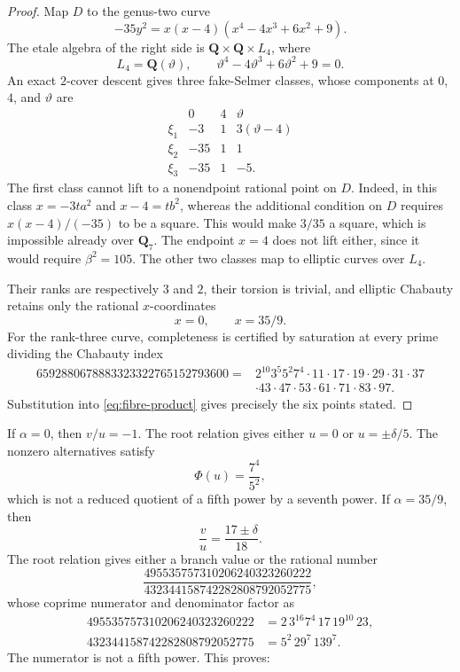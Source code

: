 \documentclass[11pt]{article}
\newcommand{\Q}{\mathbf Q}
\theoremstyle{definition}
\theoremstyle{remark}
\begin{document}
\begin{proof}
Map $D$ to the genus-two curve
\begin{equation}\label{eq:quadratic-genus2}
 -35y^2=x(x-4)(x^4-4x^3+6x^2+9).
\end{equation}
The etale algebra of the right side is
$\Q\times\Q\times L_4$, where
\[
 L_4=\Q(\vartheta),\qquad
 \vartheta^4-4\vartheta^3+6\vartheta^2+9=0.
\]
An exact $2$-cover descent \cite{BruinStollDescent} gives three
fake-Selmer classes, whose components
at $0$, $4$, and $\vartheta$ are
\[
\begin{array}{c|ccc}
 &0&4&\vartheta\\ \hline
 \xi_1&-3&1&3(\vartheta-4)\\
 \xi_2&-35&1&1\\
 \xi_3&-35&1&-5.
\end{array}
\]
The first class cannot lift to a nonendpoint rational point on $D$.
Indeed, in this class $x=-3ta^2$ and $x-4=tb^2$, whereas the additional
condition on $D$ requires $x(x-4)/(-35)$ to be a square.  This would make
$3/35$ a square, which is impossible already over $\Q_7$.  The endpoint
$x=4$ does not lift either, since it would require $\beta^2=105$.
The other two classes map to elliptic curves over $L_4$.

Their
ranks are respectively $3$ and $2$, their torsion is trivial, and elliptic
Chabauty \cite{BruinEC} retains only the rational $x$-coordinates
\[
                               x=0,\qquad x=35/9.
\]
For the rank-three curve, completeness is certified by saturation at every
prime dividing the Chabauty index
\[
\begin{split}
6592880678883323322765152793600
={}&2^{10}3^5 5^2 7^4\cdot11\cdot17\cdot19\cdot29\cdot31\cdot37\\
 &\cdot43\cdot47\cdot53\cdot61\cdot71\cdot83\cdot97.
\end{split}
\]
Substitution into \eqref{eq:fibre-product} gives precisely the six points
stated.
\end{proof}

If $\alpha=0$, then $v/u=-1$.  The root relation gives either $u=0$ or
$u=\pm\delta/5$.  The nonzero alternatives satisfy
\[
                            \Phi(u)=\frac{7^4}{5^2},
\]
which is not a reduced quotient of a fifth power by a seventh power.  If
$\alpha=35/9$, then
\[
 \frac vu=\frac{17\pm\delta}{18}.
\]
The root relation gives either a branch value or the rational number
\[
 \frac{495535757310206240323260222}
      {432344158742282808792052775},
\]
whose coprime numerator and denominator factor as
\[
\begin{aligned}
495535757310206240323260222
 &=2\,3^{16}7^4\,17\,19^{10}\,23,\\
432344158742282808792052775
 &=5^2\,29^7\,139^7.
\end{aligned}
\]
The numerator is not a fifth power.  This proves:
\end{document}
